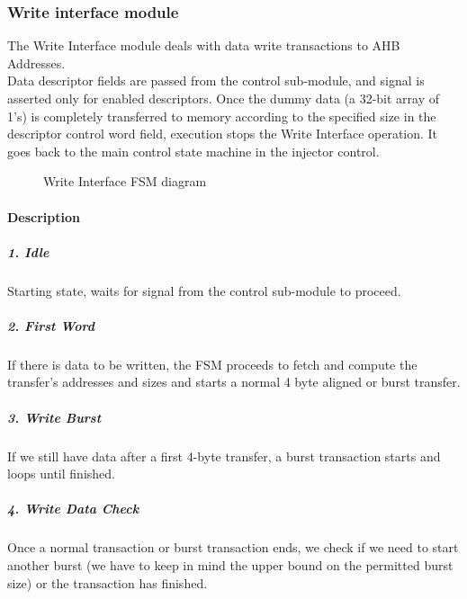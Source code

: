 \subsubsection{Write interface module}
The Write Interface module deals with data write transactions to AHB Addresses.\\
Data descriptor fields are passed from the control sub-module, and  signal is asserted only for enabled descriptors.
Once the dummy data (a 32-bit array of 1's) is completely transferred to memory according to the specified size in the descriptor control word field, execution stops the Write Interface operation. It goes back to the main control state machine in the injector control.\\

\begin{figure}[ht]
	\centering
	\caption{Write Interface FSM diagram}
	\label{fig:write_states}
\end{figure}

\paragraph{Description}
\subparagraph{1. Idle}
Starting state, waits for  signal from the control sub-module to proceed.

\subparagraph{2. First Word}
If there is data to be written, the FSM proceeds to fetch and compute the transfer's addresses and sizes and starts a normal 4 byte aligned or burst transfer.

\subparagraph{3. Write Burst}
If we still have data after a first 4-byte transfer, a burst transaction starts and loops until finished.

\subparagraph{4. Write  Data Check}
Once a normal transaction or burst transaction ends, we check if we need to start another burst (we have to keep in mind the upper bound on the permitted burst size) or the transaction has finished.\\[0.5cm]


